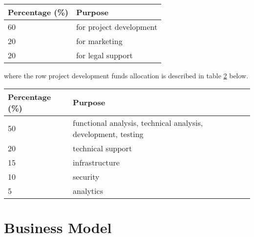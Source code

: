 \documentclass[11pt,fleqn,oneside]{book} %
\begin{document}
\vspace{5mm}
\begin{table}[H]
	\centering
	\begin{tabular}{l l}
		\toprule
		\textbf{Percentage (\%)} & \textbf{Purpose} \\
		\midrule
		60		& for project development	\\
		20		& for marketing	\\
		20		& for legal support	\\
		\bottomrule
	\end{tabular}
	\label{tab:division}
\end{table}

\vspace{5mm}
where the row project development funds allocation is described in table \ref{tab:focus} below.

\vspace{5mm}
\begin{table}[H]
	\centering
	\begin{tabular}{l l}
		\toprule
		\textbf{Percentage (\%)} & \textbf{Purpose} \\
		\midrule
		50		& functional analysis, technical analysis, development, testing	\\
		20		& technical support	\\
		15		& infrastructure	\\
		10		& security	\\
		5		& analytics	\\
		\bottomrule
	\end{tabular}
	\label{tab:focus}
\end{table}



\chapter{Business Model}
\end{document}

